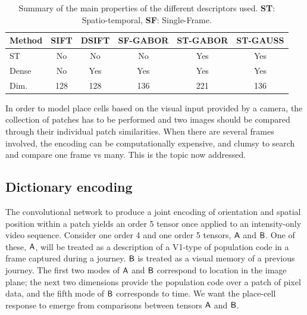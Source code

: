 \begin{table}
\centering
   \begin{tabular}{lccccc}
    Method          & SIFT & DSIFT & SF-GABOR & ST-GABOR & ST-GAUSS \\ \hline
    ST			   & No   & No    & No       & Yes      & Yes      \\ \hline
    Dense           & No   & Yes   & Yes      & Yes      & Yes      \\ \hline
    Dim.       & 128  & 128   & 136      & 221      & 136      \\
    \end{tabular}
\caption{Summary of the main properties of the different descriptors used. \textbf{ST}: Spatio-temporal, \textbf{SF}: Single-Frame.}
\label{tab:methods}

\end{table}



In order to model place cells based on the visual input provided by a camera, the collection of patches has to be performed and two images should be compared through their individual patch similarities. When there are several frames involved, the encoding can be computationally expensive, and clumsy to search and compare one frame vs many.  This is the topic now addressed.

\subsection{Dictionary encoding}
The convolutional network to produce a joint encoding of orientation and spatial position within a patch yields an order 5 tensor once applied to an intensity-only video sequence.  Consider one order 4 and one order 5 tensors, $\mathsf{A}$ and $\mathsf{B}$. One of these, $\mathsf{A}$, will be treated as a description of a V1-type of population code in a frame captured during a journey. $\mathsf{B}$ is treated as a visual memory of a previous journey. The first two modes of $\mathsf{A}$ and $\mathsf{B}$ correspond to location in the image plane; the next two dimensions provide the population code over a patch of pixel data, and the fifth mode of $\mathsf{B}$ corresponds to time. We want the place-cell response to emerge from comparisons between tensors $\mathsf{A}$ and $\mathsf{B}$.

